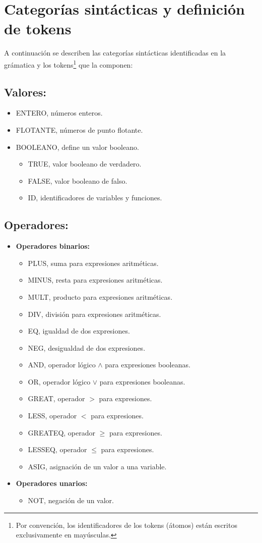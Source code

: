 \documentclass[12pt]{article}
\begin{document}
\section{Categorías sintácticas y definición de tokens}
A continuación se describen las categorías sintácticas identificadas en la grámatica y los tokens\footnote{Por convención, los identificadores de los tokens (átomos) están escritos exclusivamente en mayúsculas.} que la componen:\\
\subsection{Valores:}
\begin{itemize}
  \item ENTERO, números enteros.
    \item FLOTANTE, números de punto flotante.
    \item BOOLEANO, define un valor booleano.
      \begin{itemize}
      \item TRUE, valor booleano de verdadero.
      \item FALSE, valor booleano de falso.
      \item ID, identificadores de variables y funciones.
      \end{itemize}
\end{itemize}
\subsection{Operadores:}
\begin{itemize}
  \item \textbf{Operadores binarios:}
  \begin{itemize}
  \item PLUS, suma para expresiones aritméticas.	
  \item MINUS, resta para expresiones aritméticas.
  \item MULT, producto para expresiones aritméticas.
  \item DIV, división para expresiones aritméticas.
  \item EQ, igualdad de dos expresiones.
  \item NEG, desigualdad de dos expresiones.
  \item AND, operador lógico $\land$ para expresiones booleanas.
  \item OR, operador lógico $\lor$ para expresiones booleanas.
  \item GREAT, operador $>$  para expresiones.
  \item LESS, operador $<$ para expresiones.
  \item GREATEQ, operador $\geq$ para expresiones.
  \item LESSEQ, operador $\leq$ para expresiones.
  \item ASIG, asignación de un valor a una variable.
  \end{itemize}
\item \textbf{Operadores unarios:}
  \begin{itemize}
  \item NOT, negación de un valor.
  \end{itemize}
\end{itemize}
\end{document}
